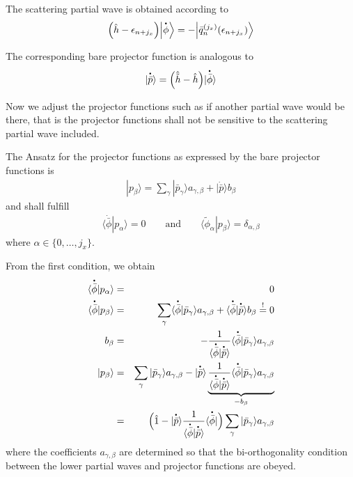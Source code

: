 \documentclass[11pt,a4paper]{report}
\begin{document}
The scattering partial wave is obtained according to 
\begin{eqnarray}
\Bigl(\hat{h}-\epsilon_{n+j_x}\Bigr)
\Bigl|\dot{\phi}\Bigr\rangle
=-\Bigl|\bar{q}_n^{(j_x)}(\epsilon_{n+j_x})\Bigr\rangle
\end{eqnarray}

The corresponding bare projector function is analogous to
\begin{eqnarray}
|\dot{\bar{p}}\rangle
=\Bigl(\hat{\tilde{h}}-\hat{h}\Bigr)|\dot{\bar{\phi}}\rangle
\end{eqnarray}

Now we adjust the projector functions such as if another partial wave
would be there, that is the projector functions shall not be sensitive
to the scattering partial wave included.

The Ansatz for the projector functions as expressed by the bare
projector functions is
\begin{eqnarray}
|p_\beta\rangle=\sum_\gamma|\bar{p}_\gamma\rangle a_{\gamma,\beta}
+|\dot{\bar{p}}\rangle b_\beta
\end{eqnarray}
and shall fulfill
\begin{eqnarray}
\langle\dot{\bar{\phi}}|p_\alpha\rangle=0
\qquad\text{and}\qquad
\langle\tilde{\phi}_\alpha|p_\beta\rangle=\delta_{\alpha,\beta}
\end{eqnarray}
where $\alpha\in\{0,\ldots,j_x\}$.

From the first condition, we obtain
\begin{eqnarray}
\langle\dot{\bar{\phi}}|p_\alpha\rangle&=&0
\nonumber\\
\langle\dot{\bar{\phi}}|p_\beta\rangle&=&\sum_\gamma
\langle\dot{\bar{\phi}}|\bar{p}_\gamma\rangle a_{\gamma,\beta}
+\langle\dot{\bar{\phi}}|\dot{\bar{p}}\rangle b_\beta
\stackrel{!}{=}0
\nonumber\\
b_\beta&=&-\frac{1}{\langle\dot{\bar{\phi}}|\dot{\bar{p}}\rangle}
\langle\dot{\bar{\phi}}|\bar{p}_\gamma\rangle a_{\gamma,\beta}
\nonumber\\
|p_\beta\rangle
&=&\sum_\gamma|\bar{p}_\gamma\rangle a_{\gamma,\beta}
-|\dot{\bar{p}}\rangle 
\underbrace{\frac{1}{\langle\dot{\bar{\phi}}|\dot{\bar{p}}\rangle}
\langle\dot{\bar{\phi}}|\bar{p}_\gamma\rangle a_{\gamma,\beta}
}_{-b_\beta}
\nonumber\\
&=&
\Bigl(\hat{1}
-|\dot{\bar{p}}\rangle 
\frac{1}{\langle\dot{\bar{\phi}}|\dot{\bar{p}}\rangle}
\langle\dot{\bar{\phi}}|\Bigr)
\sum_\gamma|\bar{p}_\gamma\rangle a_{\gamma,\beta}
\end{eqnarray}
where the coefficients $a_{\gamma,\beta}$ are determined so that the
bi-orthogonality condition between the lower partial waves and
projector functions are obeyed.
\end{document}
